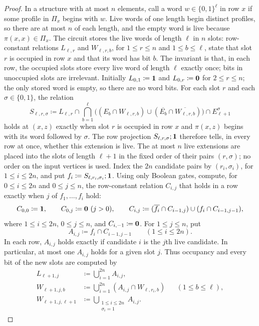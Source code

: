 \begin{proof}
In a structure with at most $n$ elements, call a word
$w\in\{0,1\}^\ell$  in row $x$ if some profile in $\Pi_x$
begins with $w$. Live words of one length begin distinct profiles, so
there are at most $n$ of each length, and the empty word is live because
$\pi(x,x)\in\Pi_x$. The circuit stores the live words of length $\ell$ in
$n$ slots: row-constant relations $L_{\ell,r}$ and $W_{\ell,r,b}$, for
$1\le r\le n$ and $1\le b\le\ell$, state that slot $r$ is occupied in row $x$ and
that its word has bit $b$. The invariant is that, in each row, the
occupied slots store every live word of length $\ell$ exactly once;
bits in unoccupied slots are irrelevant. Initially $L_{0,1}\coloneqq\mathbf{1}$ and
$L_{0,r}\coloneqq\mathbf{0}$ for $2\le r\le n$; the only stored word
is empty, so there are no word bits. For each slot $r$ and each
$\sigma\in\{0,1\}$, the relation
\[
 S_{\ell,r,\sigma}\coloneqq L_{\ell,r}\cap
 \bigcap_{b=1}^{\ell}\bigl((E_b\cap W_{\ell,r,b})\cup
     (\overline{E_b}\cap\overline{W_{\ell,r,b}})\bigr)\cap E_{\ell+1}^\sigma
\]
holds at $(x,z)$ exactly when slot $r$ is occupied in row $x$ and
$\pi(x,z)$ begins with its word followed by $\sigma$. The row projection
$S_{\ell,r,\sigma};\mathbf{1}$ therefore tells, in every row at once, whether
this extension is live. The at most $n$ live extensions are placed into the slots of length
$\ell+1$ in the fixed order of their pairs $(r,\sigma)$; no order on
the input vertices is used. Index the $2n$ candidate pairs by
$(r_i,\sigma_i)$, for $1\le i\le 2n$, and put
$f_i\coloneqq S_{\ell,r_i,\sigma_i};\mathbf{1}$. Using only Boolean gates,
compute, for $0\le i\le 2n$ and $0\le j\le n$, the row-constant
relation $C_{i,j}$ that holds in a row exactly when $j$ of
$f_1,\ldots,f_i$ hold:
\[
 C_{0,0}\coloneqq\mathbf{1},\qquad C_{0,j}\coloneqq\mathbf{0}\ (j>0),\qquad
 C_{i,j}\coloneqq(\overline{f_i}\cap C_{i-1,j})
       \cup(f_i\cap C_{i-1,j-1}),
\]
where $1\le i\le 2n$, $0\le j\le n$, and
$C_{i,-1}\coloneqq\mathbf{0}$. For $1\le j\le n$, put
\[
 A_{i,j}\coloneqq f_i\cap C_{i-1,j-1}\qquad(1\le i\le 2n).
\]
In each row, $A_{i,j}$ holds exactly if candidate $i$ is the $j$th
live candidate. In particular, at most one $A_{i,j}$ holds for a given
slot $j$. Thus occupancy and every bit of the new slots are computed by
\[
\begin{aligned}
 L_{\ell+1,j}
   &\coloneqq\bigcup_{i=1}^{2n} A_{i,j},\\
 W_{\ell+1,j,b}
   &\coloneqq\bigcup_{i=1}^{2n}
       (A_{i,j}\cap W_{\ell,r_i,b})
       &&(1\le b\le\ell),\\
 W_{\ell+1,j,\ell+1}
   &\coloneqq\bigcup_{\substack{1\le i\le 2n\\\sigma_i=1}} A_{i,j}.

\end{aligned}\]
\end{proof}
